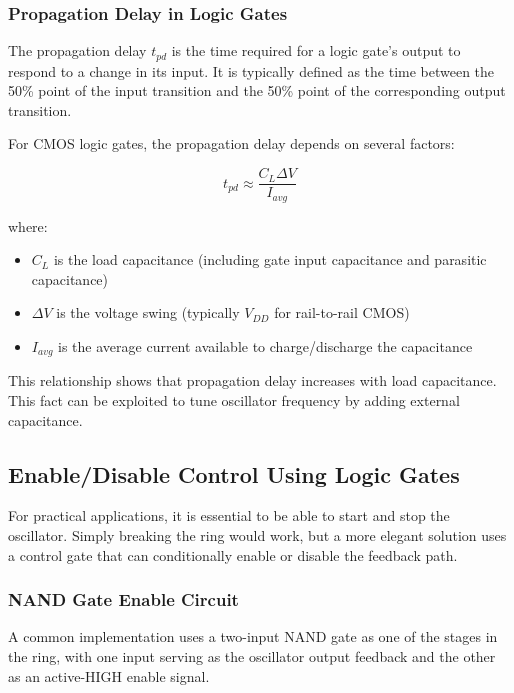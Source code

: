 \documentclass[10pt]{article}
\begin{document}
\subsubsection{Propagation Delay in Logic Gates}

The propagation delay $t_{pd}$ is the time required for a logic gate's output to respond to a change in its input. It is typically defined as the time between the 50\% point of the input transition and the 50\% point of the corresponding output transition.

For CMOS logic gates, the propagation delay depends on several factors:

\begin{equation}
    t_{pd} \approx \frac{C_L \Delta V}{I_{avg}}
    \label{eq:prop_delay}
\end{equation}

where:
\begin{itemize}
    \item $C_L$ is the load capacitance (including gate input capacitance and parasitic capacitance)
    \item $\Delta V$ is the voltage swing (typically $V_{DD}$ for rail-to-rail CMOS)
    \item $I_{avg}$ is the average current available to charge/discharge the capacitance
\end{itemize}

This relationship shows that propagation delay increases with load capacitance.  This fact can be exploited to tune oscillator frequency by adding external capacitance. 


\subsection{Enable/Disable Control Using Logic Gates}

For practical applications, it is essential to be able to start and stop the oscillator.  Simply breaking the ring would work, but a more elegant solution uses a control gate that can conditionally enable or disable the feedback path. 

\subsubsection{NAND Gate Enable Circuit}

A common implementation uses a two-input NAND gate as one of the stages in the ring, with one input serving as the oscillator output feedback and the other as an active-HIGH enable signal. 
\end{document}

